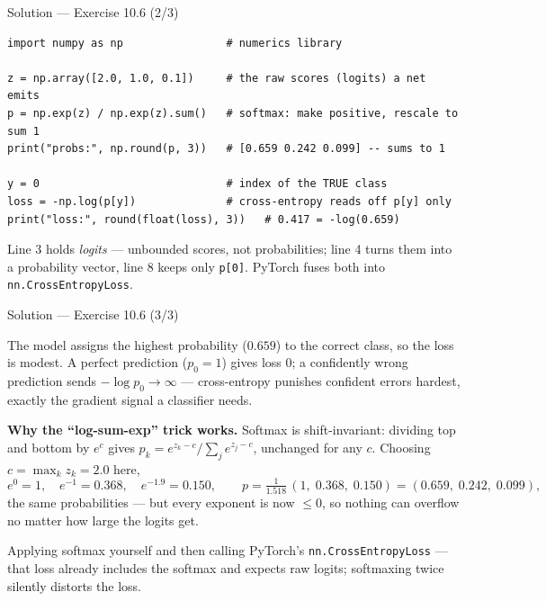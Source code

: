 \documentclass[aspectratio=169,11pt]{beamer}
\begin{document}
\begin{frame}[fragile]{Solution --- Exercise 10.6 (2/3)}
\begin{solutionbox}
\begin{lstlisting}
import numpy as np                # numerics library

z = np.array([2.0, 1.0, 0.1])     # the raw scores (logits) a net emits
p = np.exp(z) / np.exp(z).sum()   # softmax: make positive, rescale to sum 1
print("probs:", np.round(p, 3))   # [0.659 0.242 0.099] -- sums to 1

y = 0                             # index of the TRUE class
loss = -np.log(p[y])              # cross-entropy reads off p[y] only
print("loss:", round(float(loss), 3))   # 0.417 = -log(0.659)
\end{lstlisting}
\end{solutionbox}
\begin{readme}{\scriptsize
  Line 3 holds \emph{logits} --- unbounded scores, not probabilities; line 4 turns them
  into a probability vector, line 8 keeps only \texttt{p[0]}. PyTorch fuses both into
  \texttt{nn.CrossEntropyLoss}.}
\end{readme}
\end{frame}

\begin{frame}{Solution --- Exercise 10.6 (3/3)}
\begin{solutionbox}
  The model assigns the highest probability ($0.659$) to the correct
  class, so the loss is modest. A perfect prediction ($p_0 = 1$)
  gives loss $0$; a confidently wrong prediction sends
  $-\log p_0 \to \infty$ --- cross-entropy punishes confident errors
  hardest, exactly the gradient signal a classifier needs.

  \medskip
  \textbf{Why the ``log-sum-exp'' trick works.} Softmax is shift-invariant:
  dividing top and bottom by $e^{c}$ gives $p_k = e^{z_k - c}/\sum_j e^{z_j - c}$,
  unchanged for any $c$. Choosing $c = \max_k z_k = 2.0$ here,
  \[
    e^{0} = 1,\quad e^{-1} = 0.368,\quad e^{-1.9} = 0.150,\qquad
    p = \tfrac{1}{1.518}\,(1,\; 0.368,\; 0.150) = (0.659,\; 0.242,\; 0.099),
  \]
  the same probabilities --- but every exponent is now $\le 0$, so nothing
  can overflow no matter how large the logits get.

\end{solutionbox}
\begin{mistake}
  Applying softmax yourself and then calling PyTorch's
  \texttt{nn.CrossEntropyLoss} --- that loss already includes the softmax and
  expects raw logits; softmaxing twice silently distorts the loss.
\end{mistake}
\end{frame}
\end{document}
